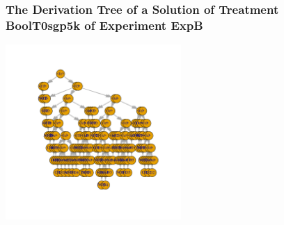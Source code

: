  \begin{frame}
 \frametitle{ The Derivation Tree of a Solution of Treatment BoolT0sgp5k of Experiment ExpB }
 \begin{center}
\includegraphics[width=0.5\textwidth, angle=0]
{ExpBDerivationTreeFigure003.pdf}
 \end{center}
 \label{report/ExpBDerivationTreeFigure003.pdf}  
 \end{frame}

